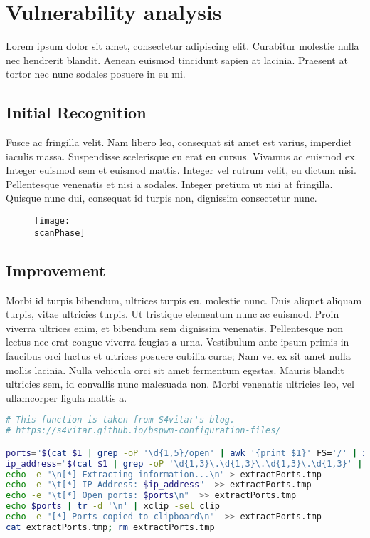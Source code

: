 \section{Vulnerability analysis}
Lorem ipsum dolor sit amet, consectetur adipiscing elit. Curabitur molestie nulla nec hendrerit
blandit. Aenean euismod tincidunt sapien at lacinia. Praesent at tortor nec nunc sodales posuere in
eu mi. 

\subsection{Initial Recognition}
Fusce ac fringilla velit. Nam libero leo, consequat sit amet est varius, imperdiet iaculis
massa. Suspendisse scelerisque eu erat eu cursus. Vivamus ac euismod ex. Integer euismod sem et 
euismod mattis. Integer vel rutrum velit, eu dictum nisi. Pellentesque venenatis et nisi a sodales.
Integer pretium ut nisi at fringilla. Quisque nunc dui, consequat id turpis non, dignissim 
consectetur nunc.

\begin{figure}[h]
    \begin{center}
        \texttt{[image: \\scanPhase]}
    \end{center}
\end{figure}

\subsection{Improvement}

Morbi id turpis bibendum, ultrices turpis eu, molestie nunc. Duis aliquet aliquam turpis, vitae
ultricies turpis. Ut tristique elementum nunc ac euismod. Proin viverra ultrices enim, et bibendum
sem dignissim venenatis. Pellentesque non lectus nec erat congue viverra feugiat a urna. Vestibulum
ante ipsum primis in faucibus orci luctus et ultrices posuere cubilia curae; Nam vel ex sit amet
nulla mollis lacinia. Nulla vehicula orci sit amet fermentum egestas. Mauris blandit ultricies sem,
id convallis nunc malesuada non. Morbi venenatis ultricies leo, vel ullamcorper ligula mattis a.\\

\begin{lstlisting}[language=Bash, caption=This script allow us to extract nmap generated info]
# This function is taken from S4vitar's blog.
# https://s4vitar.github.io/bspwm-configuration-files/

ports="$(cat $1 | grep -oP '\d{1,5}/open' | awk '{print $1}' FS='/' | xargs | tr ' ' ',')"
ip_address="$(cat $1 | grep -oP '\d{1,3}\.\d{1,3}\.\d{1,3}\.\d{1,3}' | sort -u | head -n 1)"
echo -e "\n[*] Extracting information...\n" > extractPorts.tmp
echo -e "\t[*] IP Address: $ip_address"  >> extractPorts.tmp
echo -e "\t[*] Open ports: $ports\n"  >> extractPorts.tmp
echo $ports | tr -d '\n' | xclip -sel clip
echo -e "[*] Ports copied to clipboard\n"  >> extractPorts.tmp
cat extractPorts.tmp; rm extractPorts.tmp
\end{lstlisting}

